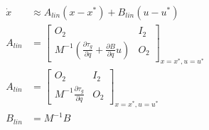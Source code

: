 \documentclass[conference]{IEEEtran}
\begin{document}
\begin{align}
	\dot x &\approx A_{lin}(x-x^*) + B_{lin}(u-u^*) \\
	A_{lin} &= \begin{bmatrix}
		O_2 & I_2 \\
		M^{-1}(\frac{\partial\tau_g}{\partial q} + \frac{\partial B}{\partial q}u) & O_2
	\end{bmatrix}_{x=x^*,u=u^*} \\
	A_{lin} &= \begin{bmatrix}
		O_2 & I_2 \\
		M^{-1}\frac{\partial\tau_g}{\partial q} & O_2
	\end{bmatrix}_{x=x^*,u=u^*} \\
	B_{lin} &= M^{-1}B \\
\end{align}
\end{document}
